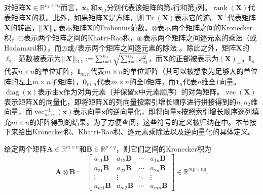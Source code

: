对矩阵$\boldsymbol{X}\in\mathbb{R}^{n_1\times n_2}$而言，$\boldsymbol{x}_{i:}$和$\boldsymbol{x}_{:j}$分别代表该矩阵的第$i$行和第$j$列。$\operatorname{rank}(\boldsymbol{X})$代表矩阵$\boldsymbol{X}$的秩。此外，如果矩阵$\boldsymbol{X}$是方阵，则$\operatorname{Tr}(\boldsymbol{X})$表示它的迹。$\boldsymbol{X}^{\top}$代表矩阵$\boldsymbol{X}$的转置，$\left\lVert\boldsymbol{X}\right\rVert_F$表示矩阵$\boldsymbol{X}$的Frobenius范数。$\otimes$表示两个矩阵之间的Kronecker积，$\odot$表示两个矩阵之间的Khatri-Rao积，$\oast$表示两个矩阵之间逐元素的乘法（或Hadamard积），而$\oslash$或$/$表示两个矩阵之间逐元素的除法
。除此之外，矩阵$\boldsymbol{X}$的$\ell_{2,1}$范数被表示为$\left\lVert\boldsymbol{X}\right\rVert_{2,1}:=\sum_{i=1}^{n_1} \sqrt{\sum_{j=1}^{n_2} x_{i j}^{2}}$，而$\boldsymbol{X}$的正部被表示为$(\boldsymbol{X})_{+}$。$\boldsymbol{I}_{n}$代表$n\times n$的单位矩阵，$\boldsymbol{I}_{m,n}$代表$m\times n$的单位矩阵（其可以被想象为足够大的单位阵的左上$m\times n$子矩阵），$\boldsymbol{0}_{m,n}$代表$m\times n$的全$0$矩阵，而$\boldsymbol{1}_{n}$代表$n$维全$1$向量。$\operatorname{diag}(\boldsymbol{x})$表示由$\boldsymbol{x}$作为对角元素（并保留$\boldsymbol{x}$中元素顺序）的对角矩阵。$\operatorname{vec}(\boldsymbol{X})$表示矩阵$\boldsymbol{X}$的向量化，即将矩阵$\boldsymbol{X}$的列向量按索引增长顺序进行拼接得到的$n_{1}n_{2}$维向量，而$\operatorname{vec}^{-1}_{m,n}(\boldsymbol{x})$表示向量$\boldsymbol{x}$的逆向量化，即将向量$\boldsymbol{x}$按照索引增长顺序逐列填充$m\times n$的矩阵得到的结果。为了方便查阅，这些符号的定义被归纳在中。本节接下来给出Kronecker积、Khatri-Rao积、逐元素乘除法以及逆向量化的具体定义。

\begin{definition}[Kronecker积]\kaishu
	给定两个矩阵$\boldsymbol{A}\in\mathbb{R}^{m\times n}$和$\boldsymbol{B}\in\mathbb{R}^{p\times q}$，则它们之间的Kronecker积为
	\begin{equation*}
		\boldsymbol{A} \otimes \boldsymbol{B}:=\left[\begin{array}{cccc}
		a_{11} \boldsymbol{B} & a_{12} \boldsymbol{B} & \cdots & a_{1 n} \boldsymbol{B} \\
		a_{21} \boldsymbol{B} & a_{22} \boldsymbol{B} & \cdots & a_{2 n} \boldsymbol{B} \\
		\vdots & \vdots & \ddots & \vdots \\
		a_{m 1} \boldsymbol{B} & a_{m 2} \boldsymbol{B} & \cdots & a_{m n} \boldsymbol{B}
		\end{array}\right]\in\mathbb{R}^{mp\times nq}.
	\end{equation*}
\end{definition}


